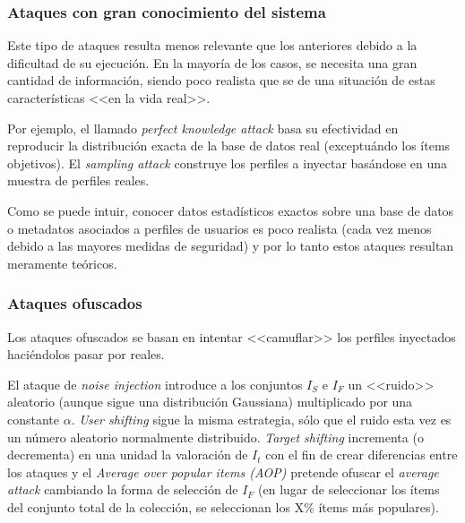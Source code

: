 \subsubsection{Ataques con gran conocimiento del sistema}

Este tipo de ataques resulta menos relevante que los anteriores debido a la dificultad de su ejecución. En la mayoría de los casos, se necesita una gran cantidad de información, siendo poco realista que se de una situación de estas características <<en la vida real>>.

Por ejemplo, el llamado \textit{perfect knowledge attack} basa su efectividad en reproducir la distribución exacta de la base de datos real (exceptuándo los ítems objetivos). El \textit{sampling attack} construye los perfiles a inyectar basándose en una muestra de perfiles reales.

Como se puede intuir, conocer datos estadísticos exactos sobre una base de datos o metadatos asociados a perfiles de usuarios es poco realista (cada vez menos debido a las mayores medidas de seguridad) y por lo tanto estos ataques resultan meramente teóricos.

\subsubsection{Ataques ofuscados}

Los ataques ofuscados se basan en intentar <<camuflar>> los perfiles inyectados haciéndolos pasar por reales.

El ataque de \textit{noise injection} introduce a los conjuntos $I_S$ e $I_F$ un <<ruido>> aleatorio (aunque sigue una distribución Gaussiana) multiplicado por una constante $\alpha$. \textit{User shifting} sigue la misma estrategia, sólo que el ruido esta vez es un número aleatorio normalmente distribuido. \textit{Target shifting} incrementa (o decrementa) en una unidad la valoración de $I_t$ con el fin de crear diferencias entre los ataques y el \textit{Average over popular items (AOP)} pretende ofuscar el \textit{average attack} cambiando la forma de selección de $I_F$ (en lugar de seleccionar los ítems del conjunto total de la colección, se seleccionan los X\% ítems más populares).

